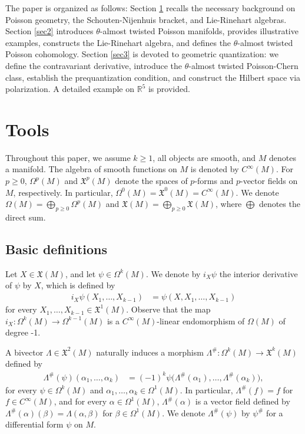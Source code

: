 \documentclass[a4paper,10pt]{article}
\numberwithin{equation}{section}
\theoremstyle{plain}
\begin{document}
The paper is organized as follows: Section \ref{sec1} recalls the necessary background on Poisson geometry, the Schouten-Nijenhuis bracket, and Lie-Rinehart algebras. Section \ref{sec2} introduces $\theta$-almost twisted Poisson manifolds, provides illustrative examples, constructs the Lie-Rinehart algebra, and defines the $\theta$-almost twisted Poisson cohomology. Section \ref{sec3} is devoted to geometric quantization: we define the contravariant derivative, introduce the $\theta$-almost twisted Poisson-Chern class, establish the prequantization condition, and construct the Hilbert space via polarization. A detailed example on $\mathbb{R}^5$ is provided.
	
	\section{Tools}\label{sec1}
Throughout this paper, we assume $k \geq 1$, all objects are smooth, and $M$ denotes a manifold. The algebra of smooth functions on $M$ is denoted by $C^\infty(M)$.
For $p \geq 0$, $\Omega^p(M)$ and $\mathfrak{X}^p(M)$ denote the spaces of $p$-forms and $p$-vector fields on $M$, respectively. In particular, $\Omega^0(M) = \mathfrak{X}^0(M) = C^\infty(M)$. We denote $\Omega(M) = \bigoplus_{p \geq 0} \Omega^p(M)$ and $\mathfrak{X}(M) = \bigoplus_{p \geq 0} \mathfrak{X}(M)$, where $\bigoplus$ denotes the direct sum.
	
	
	
	
	\subsection{Basic definitions}
Let $X\in \mathfrak{X}(M)$, and let $\psi\in\Omega^k(M)$. We denote by $i_X\psi$ the interior derivative of $\psi$ by $X$, which is defined by
\begin{align*}
	i_X\psi(X_1,\dots,X_{k-1})&=\psi(X,X_1,\dots,X_{k-1})
\end{align*}
for every $X_1,\dots,X_{k-1}\in \mathfrak{X}^1(M)$. Observe that the map $i_X:\Omega^k(M)\to\Omega^{k-1}(M)$ is a $C^\infty(M)$-linear endomorphism of $\Omega(M)$ of degree -1.

A bivector $\Lambda\in \mathfrak{X}^{2}(M)$ naturally induces a morphism $\Lambda^\#: \Omega^k(M)\longrightarrow \mathfrak{X}^k(M)$ defined by
\begin{align}\label{Eq3}
	\Lambda^\#(\psi)(\alpha_1,\dots,\alpha_k) &= (-1)^{k}\psi\bigg(\Lambda^\#(\alpha_1),\dots,\Lambda^\#(\alpha_k)\bigg),
\end{align}
for every $\psi\in\Omega^k(M)$ and $\alpha_1,\dots,\alpha_k\in \Omega^1(M)$.
In particular, $\Lambda^\#(f) = f$ for $f \in C^\infty(M)$, and for every $\alpha\in \Omega^1(M)$, $\Lambda^\#(\alpha)$ is a vector field defined by $\Lambda^\#(\alpha)(\beta)=\Lambda(\alpha,\beta)$ for $\beta\in \Omega^1(M)$. We denote $\Lambda^\#(\psi)$ by $\psi^{\#}$ for a differential form $\psi$ on $M$.
\end{document}

